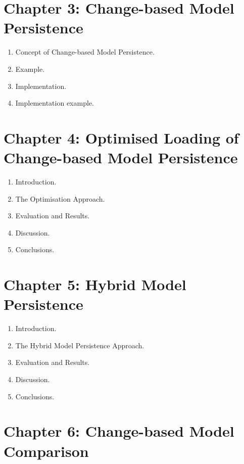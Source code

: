 \documentclass[12pt, a4paper]{report} \usepackage[titletoc]{appendix}
\begin{document}
\section{Chapter 3: Change-based Model Persistence}
\label{sec:chapter_3_Change-based_model_ersistence_plan}

\begin{enumerate}
\setlength\itemsep{0pt}
\item Concept of Change-based Model Persistence.
\item Example.
\item Implementation.
\item Implementation example.
\end{enumerate}

\section{Chapter 4: Optimised Loading of Change-based Model Persistence}
\label{sec:chapter_4_optimised_loading_change_based_model_persistence}

\begin{enumerate}
\setlength\itemsep{0pt}
\item Introduction.
\item The Optimisation Approach.
\item Evaluation and Results.
\item Discussion.
\item Conclusions.
\end{enumerate}

\section{Chapter 5: Hybrid Model Persistence}
\label{sec:chapter_5_hybrid_model_persistence}

\begin{enumerate}
\setlength\itemsep{0pt}
\item Introduction.
\item The Hybrid Model Persistence Approach.
\item Evaluation and Results.
\item Discussion.
\item Conclusions.
\end{enumerate}

\section{Chapter 6: Change-based Model Comparison}
\label{sec:chapter_6_change_based_model_comparison}
\end{document}
